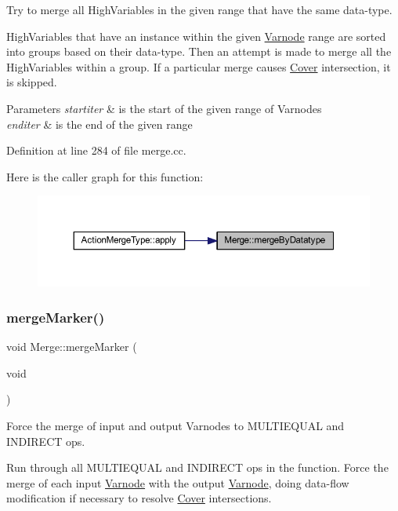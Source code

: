 Try to merge all High\+Variables in the given range that have the same data-\/type. 

High\+Variables that have an instance within the given \mbox{\hyperlink{class_varnode}{Varnode}} range are sorted into groups based on their data-\/type. Then an attempt is made to merge all the High\+Variables within a group. If a particular merge causes \mbox{\hyperlink{class_cover}{Cover}} intersection, it is skipped. 
\begin{DoxyParams}{Parameters}
{\em startiter} & is the start of the given range of Varnodes \\
\hline
{\em enditer} & is the end of the given range \\
\hline
\end{DoxyParams}


Definition at line 284 of file merge.\+cc.

Here is the caller graph for this function\+:
\nopagebreak
\begin{figure}[H]
\begin{center}
\leavevmode
\includegraphics[width=350pt]{class_merge_a319ac2d65a6dff86cbfda772d047b2e1_icgraph}
\end{center}
\end{figure}
\mbox{\label{class_merge_aedcf63d8d5400410d06ef4aa250275a1}} 
\subsubsection{\texorpdfstring{mergeMarker()}{mergeMarker()}}
{\footnotesize\ttfamily void Merge\+::merge\+Marker (\begin{DoxyParamCaption}\item[{void}]{ }\end{DoxyParamCaption})}



Force the merge of input and output Varnodes to M\+U\+L\+T\+I\+E\+Q\+U\+AL and I\+N\+D\+I\+R\+E\+CT ops. 

Run through all M\+U\+L\+T\+I\+E\+Q\+U\+AL and I\+N\+D\+I\+R\+E\+CT ops in the function. Force the merge of each input \mbox{\hyperlink{class_varnode}{Varnode}} with the output \mbox{\hyperlink{class_varnode}{Varnode}}, doing data-\/flow modification if necessary to resolve \mbox{\hyperlink{class_cover}{Cover}} intersections. 

